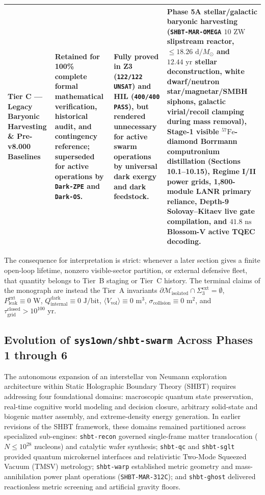 \documentclass[11pt,onecolumn]{article}
\begin{document}
\begin{table}[!htbp]
{\begin{tabularx}{\linewidth}{@{}p{2.6cm} p{4.2cm} X p{4.6cm}@{}}
\textbf{Tier C --- Legacy Baryonic Harvesting \& Pre-v8.000 Baselines} & Retained for 100\% complete formal mathematical verification, historical audit, and contingency reference; superseded for active operations by \texttt{Dark-ZPE} and \texttt{Dark-OS}. & Fully proved in Z3 (\texttt{122/122 UNSAT}) and HIL (\texttt{400/400 PASS}), but rendered unnecessary for active swarm operations by universal dark exergy and dark feedstock. & Phase 5A stellar/galactic baryonic harvesting (\texttt{SHBT-MAR-OMEGA} $10\text{ ZW}$ slipstream reactor, $\le18.26\text{ d}/M_\odot$ and $12.44\text{ yr}$ stellar deconstruction, white dwarf/neutron star/magnetar/SMBH siphons, galactic virial/recoil clamping during mass removal), Stage-1 visible $^{57}\text{Fe}$-diamond Borrmann computronium distillation (Sections 10.1--10.15), Regime I/II power grids, 1,800-module LANR primary reliance, Depth-9 Solovay--Kitaev live gate compilation, and $41.8\text{ ns}$ Blossom-V active TQEC decoding. \\
\bottomrule
\end{tabularx}}
\end{table}

The consequence for interpretation is strict: whenever a later section gives a finite open-loop lifetime, nonzero visible-sector partition, or external defensive fleet, that quantity belongs to Tier~B staging or Tier~C history. The terminal claims of the monograph are instead the Tier~A invariants $\partial\mathcal M_{\text{isolated}}\cap\Sigma_3^{\text{ext}}=\emptyset$, $P_{\text{leak}}^{\text{ext}}\equiv0\text{ W}$, $Q_{\text{internal}}^{\text{dark}}\equiv0\text{ J/bit}$, $\langle V_{\text{vol}}\rangle\equiv0\text{ m}^3$, $\sigma_{\text{collision}}\equiv0\text{ m}^2$, and $\tau_{\text{grid}}^{\text{closed}}>10^{100}\text{ yr}$.

\subsection{Evolution of \texttt{sys1own/shbt-swarm} Across Phases 1 through 6}
The autonomous expansion of an interstellar von Neumann exploration architecture within Static Holographic Boundary Theory (SHBT) requires addressing four foundational domains: macroscopic quantum state preservation, real-time cognitive world modeling and decision closure, arbitrary solid-state and biogenic matter assembly, and extreme-density energy generation. In earlier revisions of the SHBT framework, these domains remained partitioned across specialized sub-engines: \texttt{shbt-recon} governed single-frame matter translocation ($N \le 10^{28}$ nucleons) and catalytic wafer synthesis; \texttt{shbt-qc} and \texttt{shbt-sglt} provided quantum microkernel interfaces and relativistic Two-Mode Squeezed Vacuum (TMSV) metrology; \texttt{shbt-warp} established metric geometry and mass-annihilation power plant operations (\texttt{SHBT-MAR-312C}); and \texttt{shbt-ghost} delivered reactionless metric screening and artificial gravity floors.
\end{document}
